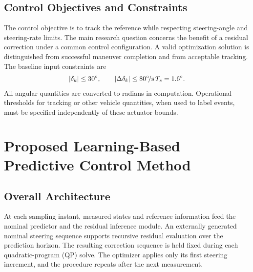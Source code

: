 \documentclass[10pt,journal]{IEEEtran}
\begin{document}
\subsection{Control Objectives and Constraints}
The control objective is to track the reference while respecting steering-angle and steering-rate limits. The main research question concerns the benefit of a residual correction under a common control configuration. A valid optimization solution is distinguished from successful maneuver completion and from acceptable tracking. The baseline input constraints are
\begin{equation}
 |\delta_k|\leq30^\circ,\qquad
 |\Delta\delta_k|\leq80^\circ\!/{\rm s}\,T_s=1.6^\circ.\label{eq:limits}
\end{equation}
All angular quantities are converted to radians in computation. Operational thresholds for tracking or other vehicle quantities, when used to label events, must be specified independently of these actuator bounds.

\section{Proposed Learning-Based Predictive Control Method}
\label{sec:method}

\subsection{Overall Architecture}
At each sampling instant, measured states and reference information feed the nominal predictor and the residual inference module. An externally generated nominal steering sequence supports recursive residual evaluation over the prediction horizon. The resulting correction sequence is held fixed during each quadratic-program (QP) solve. The optimizer applies only its first steering increment, and the procedure repeats after the next measurement.
\end{document}
